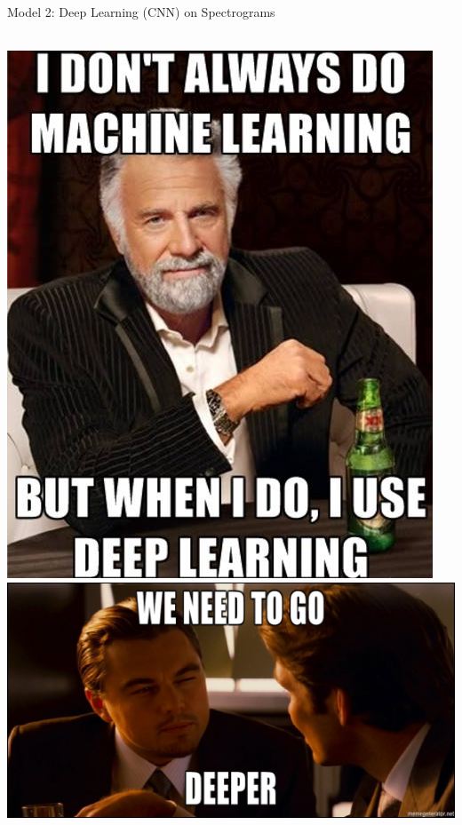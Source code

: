 \documentclass{beamer}
\begin{document}
\begin{frame}{Model 2: Deep Learning (CNN) on Spectrograms}
  \framesubtitle{}
  \begin{columns}
  \includegraphics[scale=0.27]{img/deep.png}
    \includegraphics[scale=0.18]{img/deeper.jpg}
  \end{columns}
\end{frame}
\end{document}
